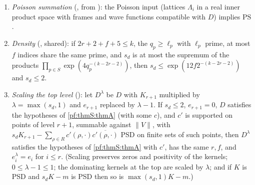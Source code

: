 \begin{enumerate}[label=(M\arabic*)]
$g_1,g_2,\mathrm{len}_I>0$.
\item\label{pf:thmS:M5} \emph{Poisson summation} (, from
): the Poisson input (lattices $\Lambda_i$ in a real
inner product space with frames and wave functions compatible with $D$) implies $\mathrm{PS}$.
\item\label{pf:thmS:M6} \emph{Density} (, shared): if
$2r+2+f+5\le k$, the $q_p\ge\ell_p$ with $\ell_p$ prime, at most $f$ indices share the same prime, and $s_d$ is at most the
supremum of the products $\prod_{p\in S}\exp(4q_p^{-(k-2r-2)})$, then $s_d\le\exp(12f2^{-(k-2r-2)})$ and $s_d\le2$.
\item\label{pf:thmS:M7} \emph{Scaling the top level} ():
let $D^\lambda$ be $D$ with $K_{r+1}$ multiplied by $\lambda=\max(s_d,1)$ and $e_{r+1}$ replaced by $\lambda-1$. If $s_d\le2$,
$e_{r+1}=0$, $D$ satisfies the hypotheses of \cref{pf:thmS:thmA} (with some $c$), and $c'$ is supported on points of level
$r+1$, summable against $\|V\|$, with $s_dK_{r+1}-\sum_{\rho\in R}c'(\rho,\cdot)\overline{c'(\rho,\cdot)}$ PSD on finite sets of
such points, then $D^\lambda$ satisfies the hypotheses of \cref{pf:thmS:thmA} with $c'$, has the same $r,f$, and
$e^\lambda_i=e_i$ for $i\le r$. (Scaling preserves zeros and positivity of the kernels; $0\le\lambda-1\le1$; the
dominating kernels at the top are scaled by $\lambda$; and if $K$ is PSD and $s_dK-m$ is PSD then so is $\max(s_d,1)K-m$.)
\end{enumerate}

